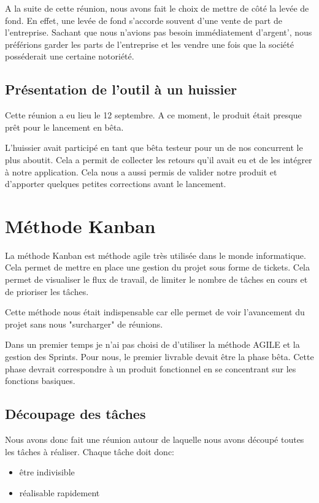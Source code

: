 \documentclass[]{report}
\begin{document}
      A la suite de cette réunion, nous avons fait le choix de mettre de côté la levée de fond. En effet, une levée de fond s'accorde souvent d'une vente de part de l'entreprise. Sachant que nous n'avions pas besoin immédiatement d'argent', nous préférions garder les parts de l'entreprise et les vendre une fois que la société posséderait une certaine notoriété.

    \subsection{Présentation de l’outil à un huissier}

      Cette réunion a eu lieu le 12 septembre. A ce moment, le produit était presque prêt pour le lancement en bêta.

      L'huissier avait participé en tant que bêta testeur pour un de nos concurrent le plus aboutit. Cela a permit de collecter les retours qu'il avait eu et de les intégrer à notre application. Cela nous a aussi permis de valider notre produit et d'apporter quelques petites corrections avant le lancement.

  \section{Méthode Kanban}

    La méthode Kanban est méthode agile très utilisée dans le monde informatique. Cela permet de mettre en place une gestion du projet sous forme de tickets. Cela permet de visualiser le flux de travail, de limiter le nombre de tâches en cours et de prioriser les tâches.

    Cette méthode nous était indispensable car elle permet de voir l'avancement du projet sans nous "surcharger" de réunions.

    Dans un premier temps je n'ai pas choisi de d'utiliser la méthode AGILE et la gestion des Sprints. Pour nous, le premier livrable devait être la phase bêta. Cette phase devrait correspondre à un produit fonctionnel en se concentrant sur les fonctions basiques.

    \subsection{Découpage des tâches}

      Nous avons donc fait une réunion autour de laquelle nous avons découpé toutes les tâches à réaliser. Chaque tâche doit donc:

      \begin{itemize}
        \item être indivisible
        \item réalisable rapidement
      \end{itemize}
\end{document}
